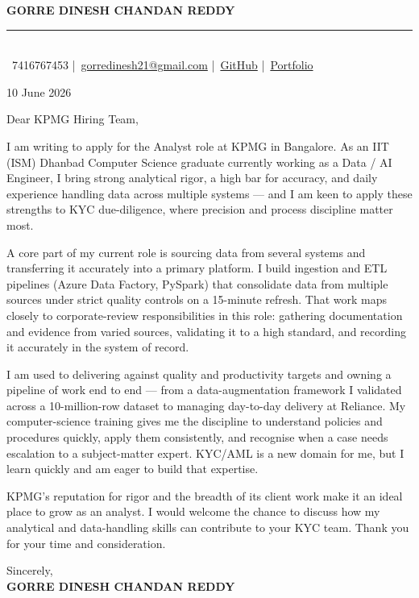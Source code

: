 \documentclass[a4paper,11pt]{article}
\begin{document}
\begin{center}
{\LARGE\textbf{GORRE DINESH CHANDAN REDDY}}\\[4pt]
\rule{\linewidth}{1.2pt}\\[3pt]
\small \faPhone\ 7416767453 \quad|\quad \faEnvelope\ \href{mailto:gorredinesh21@gmail.com}{gorredinesh21@gmail.com} \quad|\quad \faGithub\ \href{https://github.com/gorredinesh21}{GitHub} \quad|\quad \faGlobe\ \href{https://portfolio-eight-coral-tabh47k4e7.vercel.app/}{Portfolio}
\end{center}
\vspace{6pt}

10 June 2026

\vspace{8pt}
Dear KPMG Hiring Team,

I am writing to apply for the Analyst role at KPMG in Bangalore. As an IIT (ISM) Dhanbad Computer Science graduate currently working as a Data / AI Engineer, I bring strong analytical rigor, a high bar for accuracy, and daily experience handling data across multiple systems --- and I am keen to apply these strengths to KYC due-diligence, where precision and process discipline matter most.

A core part of my current role is sourcing data from several systems and transferring it accurately into a primary platform. I build ingestion and ETL pipelines (Azure Data Factory, PySpark) that consolidate data from multiple sources under strict quality controls on a 15-minute refresh. That work maps closely to corporate-review responsibilities in this role: gathering documentation and evidence from varied sources, validating it to a high standard, and recording it accurately in the system of record.

I am used to delivering against quality and productivity targets and owning a pipeline of work end to end --- from a data-augmentation framework I validated across a 10-million-row dataset to managing day-to-day delivery at Reliance. My computer-science training gives me the discipline to understand policies and procedures quickly, apply them consistently, and recognise when a case needs escalation to a subject-matter expert. KYC/AML is a new domain for me, but I learn quickly and am eager to build that expertise.

KPMG's reputation for rigor and the breadth of its client work make it an ideal place to grow as an analyst. I would welcome the chance to discuss how my analytical and data-handling skills can contribute to your KYC team. Thank you for your time and consideration.

\vspace{10pt}
Sincerely,\\[2pt]
\textbf{GORRE DINESH CHANDAN REDDY}
\end{document}
